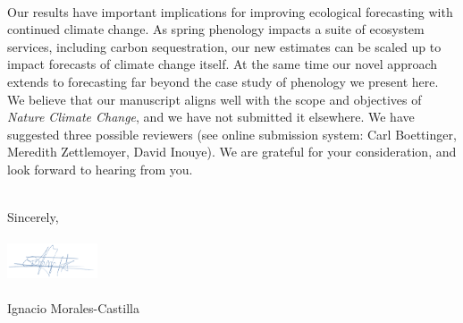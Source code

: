 \documentclass[11pt,a4paper]{letter}
\begin{document}
\begin{letter}{}
\vspace{0.25ex}\\
Our results have important implications for improving ecological forecasting with continued climate change. As spring phenology impacts a suite of ecosystem services, including carbon sequestration, our new estimates can be scaled up to impact forecasts of climate change itself. At the same time our novel approach extends to forecasting far beyond the case study of phenology we present here.
\vspace{1.5ex}\\
We believe that our manuscript aligns well with the scope and objectives of \emph{Nature Climate Change}, and we have not submitted it elsewhere. We have suggested three possible reviewers (see online submission system: Carl Boettinger, Meredith Zettlemoyer, David Inouye). We are grateful for your consideration, and look forward to hearing from you.


\vspace{1.5ex}\\
\noindent Sincerely,\\
\vspace{1.5ex}\\
 \includegraphics[width=0.2\textwidth]{Signature_IMC.png} \\
 \vspace{1.5ex}\\
\noindent Ignacio Morales-Castilla


\end{letter}
\end{document}
